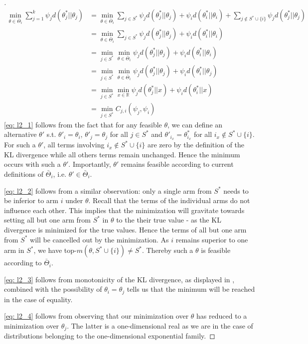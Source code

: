 \begin{proof}[]
  \begin{align}
    \min_{\theta \in \bar{\Theta}_i} \sum_{j=1}^k \psi_j d(\theta^*_j||\theta_j)
      &= \min_{\theta \in \bar{\Theta}_i} \sum_{j\in S^*}
          \psi_{j}d(\theta^*_{j} || \theta_{j}) + \psi_{i}d(\theta_{i}^* ||
          \theta_{i}) + \sum_{j \notin S^* \cup \{i\}} \psi_j
          d(\theta^*_j||\theta_j) \\
      &= \min_{\theta \in \bar{\Theta}_i} \sum_{j\in S^*}
          \psi_{j}d(\theta^*_{j} || \theta_{j}) + \psi_{i}d(\theta_{i}^* ||
          \theta_{i}) \label{eq: l2_1}\\
      &= \min_{j\in S^*} \min_{\theta \in \bar{\Theta}_i}
          \psi_{j}d(\theta^*_{j} || \theta_{j}) + \psi_{i}d(\theta_{i}^* ||
          \theta_{i}) \label{eq: l2_2}\\
      &= \min_{j\in S^*} \min_{\theta \in \bar{\Theta}_i}
          \psi_{j}d(\theta^*_{j} || \theta_{j}) + \psi_{i}d(\theta_{i}^* ||
          \theta_{j}) \label{eq: l2_3}\\
      &= \min_{j\in S^*} \min_{x \in \mathbb{R}} \psi_{j}d(\theta^*_{j} || x) +
          \psi_{i}d(\theta_{i}^* ||x) \label{eq: l2_4}\\
      &= \min_{j \in S^*} C_{j, i}(\psi_j, \psi_i)
  \end{align}
  \eqref{eq: l2_1} follows from the fact that for any feasible $\theta$, we can
  define an alternative $\theta'$ s.t. $\theta'_i = \theta_i$, $\theta'_j =
  \theta_j$ for all $j \in S^*$ and $\theta'_{i_x} = \theta^*_{i_x}$ for all
  $i_x \notin S^* \cup \{i\}$. For such a $\theta'$, all terms involving $i_x
  \notin S^* \cup \{i\}$ are zero by the definition of the KL divergence while
  all others terms remain unchanged. Hence the minimum occurs with such a
  $\theta'$. Importantly, $\theta'$ remains feasible according to current
  definitions of $\bar{\Theta}_i$, i.e. $\theta' \in \bar{\Theta}_i$.

  \eqref{eq: l2_2} follows from a similar observation: only a single arm from
  $S^*$ needs to be inferior to arm $i$ under $\theta$. Recall that the terms of
  the individual arms do not influence each other. This implies that the
  minimization will gravitate towards setting all but one arm from $S^*$ in
  $\theta$ to the their true value - as the KL divergence is minimized for the
  true values. Hence the terms of all but one arm from $S^*$ will be cancelled
  out by the minimization. As $i$ remains superior to one arm in $S^*$, we have
  top-$m(\theta, S^* \cup \{i\}) \neq S^*$. Thereby such a $\theta$ is feasible
  according to $\bar{\Theta}_i$.

  \eqref{eq: l2_3} follows from monotonicity of the KL divergence, as displayed
  in , combined with the possibility of $\theta_i =
  \theta_j$ tells us that the minimum will be reached in the case of equality.

  \eqref{eq: l2_4} follows from observing that our minimization over $\theta$
  has reduced to a minimization over $\theta_j$. The latter is a one-dimensional
  real as we are in the case of distributions belonging to the one-dimensional exponential family.
\end{proof}

